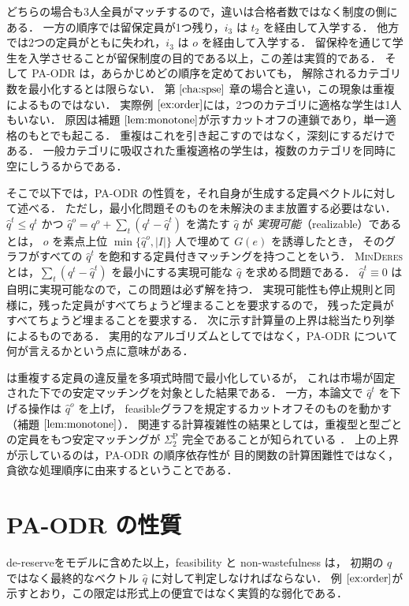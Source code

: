 \documentclass[
    12pt,          %
    a4paper,       %
    oneside,       %
    onecolumn,     %
    titlepage,     %
    final          %
]{jreport} %
\newcommand{\refchapter}[1]{第 $\ref{#1}$ 章}
\newcommand{\refexample}[1]{例 $\ref{#1}$}
\newcommand{\reflemma}[1]{補題 $\ref{#1}$}
\begin{document}
どちらの場合も3人全員がマッチするので，違いは合格者数ではなく制度の側にある．
一方の順序では留保定員が1つ残り，$i_3$ は $t_2$ を経由して入学する．
他方では2つの定員がともに失われ，$i_3$ は $o$ を経由して入学する．
留保枠を通じて学生を入学させることが留保制度の目的である以上，この差は実質的である．
そして PA-ODR は，あらかじめどの順序を定めておいても，
解除されるカテゴリ数を最小化するとは限らない．
\refchapter{cha:spse}の場合と違い，この現象は重複によるものではない．
実際\refexample{ex:order}には，2つのカテゴリに適格な学生は1人もいない．
原因は\reflemma{lem:monotone}が示すカットオフの連鎖であり，単一適格のもとでも起こる．
重複はこれを引き起こすのではなく，深刻にするだけである．
一般カテゴリに吸収された重複適格の学生は，複数のカテゴリを同時に空にしうるからである．

そこで以下では，PA-ODR の性質を，それ自身が生成する定員ベクトルに対して述べる．
ただし，最小化問題そのものを未解決のまま放置する必要はない．
$\hat q^t\le q^t$ かつ $\hat q^o=q^o+\sum_{t}(q^t-\hat q^t)$ を満たす $\hat q$ が
\emph{実現可能}（realizable）であるとは，
$o$ を素点上位 $\min\{\hat q^o,|I|\}$ 人で埋めて $G(e)$ を誘導したとき，
そのグラフがすべての $\hat q^t$ を飽和する定員付きマッチングを持つことをいう．
\textsc{MinDeres} とは，$\sum_t(q^t-\hat q^t)$ を最小にする実現可能な $\hat q$ を求める問題である．
$\hat q^t\equiv0$ は自明に実現可能なので，この問題は必ず解を持つ．
実現可能性も停止規則と同様に，残った定員がすべてちょうど埋まることを要求するので，
残った定員がすべてちょうど埋まることを要求する．
次に示す計算量の上界は総当たり列挙によるものである．
実用的なアルゴリズムとしてではなく，PA-ODR について何が言えるかという点に意味がある．

\citet{CsSu26a} は重複する定員の違反量を多項式時間で最小化しているが，
これは市場が固定された下での安定マッチングを対象とした結果である．
一方，本論文で $\hat q^t$ を下げる操作は $\hat q^o$ を上げ，
feasibleグラフを規定するカットオフそのものを動かす（\reflemma{lem:monotone}）．
関連する計算複雑性の結果としては，重複型と型ごとの定員をもつ安定マッチングが
$\Sigma_2^{\mathrm{P}}$ 完全であることが知られている \citep{CGH20a}．
上の上界が示しているのは，PA-ODR の順序依存性が
目的関数の計算困難性ではなく，貪欲な処理順序に由来するということである．

\section{PA-ODR の性質}
\label{sec:paodr-props}

de-reserveをモデルに含めた以上，feasibility と non-wastefulness は，
初期の $q$ ではなく最終的なベクトル $\hat q$ に対して判定しなければならない．
\refexample{ex:order}が示すとおり，この限定は形式上の便宜ではなく実質的な弱化である．
\end{document}
